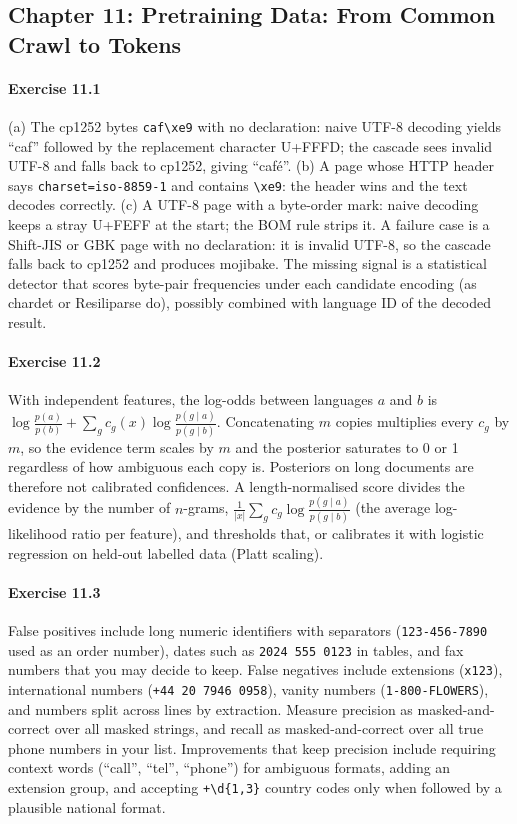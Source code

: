\subsection*{Chapter 11: Pretraining Data: From Common Crawl to Tokens}

\paragraph{Exercise 11.1} (a) The cp1252 bytes \texttt{caf\textbackslash xe9} with no
declaration: naive UTF-8 decoding yields ``caf'' followed by the replacement character U+FFFD;
the cascade sees invalid UTF-8 and falls back to cp1252, giving ``café''. (b) A page whose HTTP header
says \texttt{charset=iso-8859-1} and contains \texttt{\textbackslash xe9}: the header wins and the
text decodes correctly. (c) A UTF-8 page with a byte-order mark: naive decoding keeps a stray
U+FEFF at the start; the BOM rule strips it. A failure case is a Shift-JIS or GBK page with no
declaration: it is invalid UTF-8, so the cascade falls back to cp1252 and produces mojibake.
The missing signal is a statistical detector that scores byte-pair frequencies under each
candidate encoding (as chardet or Resiliparse do), possibly combined with language ID of the
decoded result.

\paragraph{Exercise 11.2} With independent features, the log-odds between languages $a$ and $b$ is
$\log\frac{p(a)}{p(b)} + \sum_g c_g(x)\log\frac{p(g\mid a)}{p(g\mid b)}$. Concatenating $m$ copies
multiplies every $c_g$ by $m$, so the evidence term scales by $m$ and the posterior saturates
to 0 or 1 regardless of how ambiguous each copy is. Posteriors on long documents are therefore not
calibrated confidences. A length-normalised score divides the evidence by the number of
$n$-grams, $\frac{1}{|x|}\sum_g c_g\log\frac{p(g\mid a)}{p(g\mid b)}$ (the average log-likelihood
ratio per feature), and thresholds that, or calibrates it with logistic regression on held-out
labelled data (Platt scaling).

\paragraph{Exercise 11.3} False positives include long numeric identifiers with separators
(\texttt{123-456-7890} used as an order number), dates such as \texttt{2024 555 0123} in tables,
and fax numbers that you may decide to keep. False negatives include extensions
(\texttt{x123}), international numbers (\texttt{+44 20 7946 0958}), vanity numbers
(\texttt{1-800-FLOWERS}), and numbers split across lines by extraction. Measure precision as
masked-and-correct over all masked strings, and recall as masked-and-correct over all true phone numbers in your list.
Improvements that keep precision include requiring context words (``call'', ``tel'', ``phone'') for
ambiguous formats, adding an extension group, and accepting \texttt{+\textbackslash d\{1,3\}}
country codes only when followed by a plausible national format.

